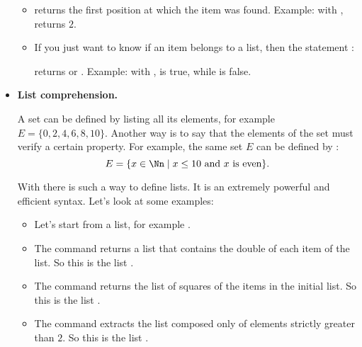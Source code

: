 \documentclass[11pt,class=report,crop=false]{standalone}
\begin{document}
\begin{cours}
\begin{itemize}
\begin{itemize}

    \item {}
    returns the first position at which the item was found. Example: with ,
    returns $2$.

  \item {} 
  If you just want to know if an item belongs to a list, then the statement :
  
  returns  or .
  Example: with ,
   \og{}\fg{} is true, while \og{}\fg{} is false.
  
\end{itemize}
   
  \item \textbf{List comprehension.}
  
  
  A set can be defined by listing all its elements, for example $E = \{0,2,4,6,8,10\}$. Another way is to say that the elements of the set must verify a certain property. For example, the same set $E$ can be defined by :
  $$E = \{ x \in \Nn \mid x \le 10 \text{ and } x \text{ is even} \}.$$
  
  With \Python{} there is such a way to define lists. It is an extremely powerful and efficient syntax. Let's look at some examples:
  \begin{itemize}
    \item Let's start from a list, for example .
    
    \item The command  returns a list that contains the double of each item of the  list. So this is the list \ci{[2,4,6,8,...]}.
    
    \item The command  returns the list of squares of the items in the initial list. So this is the list \ci{[1,4,9,16,...]}.
    
    \item The command 
    extracts the list composed only of elements strictly greater than $2$. So this is the list \ci{[3,4,5,6,7,6,5,4,3]}.
	\end{itemize}
	

\end{itemize}
\end{cours}
\end{document}
